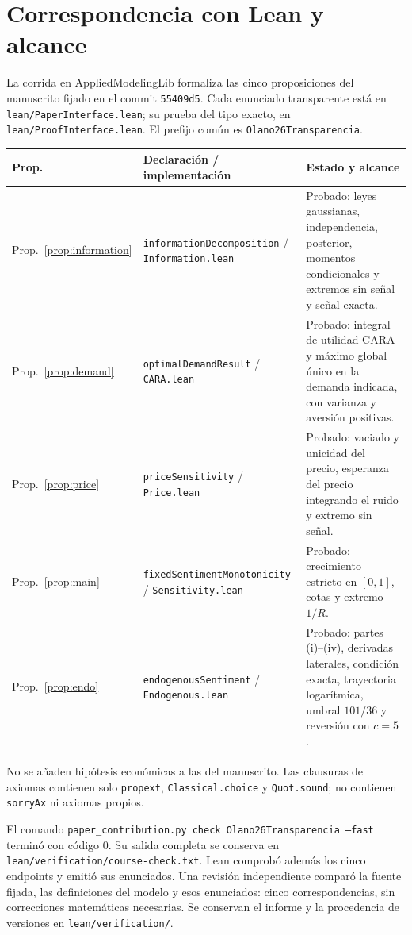 \documentclass[11pt]{article}
\begin{document}
\section{Correspondencia con Lean y alcance}
La corrida en AppliedModelingLib formaliza las cinco proposiciones del
manuscrito fijado en el commit \texttt{55409d5}. Cada enunciado transparente
está en \texttt{lean/PaperInterface.lean}; su prueba del tipo exacto, en
\texttt{lean/ProofInterface.lean}. El prefijo común es
\texttt{Olano26Transparencia}.
\begin{center}\small
\begin{tabular}{>{\raggedright\arraybackslash}p{1.3cm}>{\raggedright\arraybackslash}p{6.0cm}>{\raggedright\arraybackslash}p{5.5cm}}
\toprule
Prop. & Declaración / implementación & Estado y alcance\\
\midrule
Prop.~\ref{prop:information}
& \texttt{informationDecomposition} / \texttt{Information.lean}
& Probado: leyes gaussianas, independencia, posterior, momentos condicionales
y extremos sin señal y señal exacta.\\[0.15cm]
Prop.~\ref{prop:demand}
& \texttt{optimalDemandResult} / \texttt{CARA.lean}
& Probado: integral de utilidad CARA y máximo global único en la demanda
indicada, con varianza y aversión positivas.\\[0.15cm]
Prop.~\ref{prop:price}
& \texttt{priceSensitivity} / \texttt{Price.lean}
& Probado: vaciado y unicidad del precio, esperanza del precio integrando el
ruido y extremo sin señal.\\[0.15cm]
Prop.~\ref{prop:main}
& \texttt{fixedSentimentMonotonicity} / \texttt{Sensitivity.lean}
& Probado: crecimiento estricto en $[0,1]$, cotas y extremo $1/R$.\\[0.15cm]
Prop.~\ref{prop:endo}
& \texttt{endogenousSentiment} / \texttt{Endogenous.lean}
& Probado: partes (i)--(iv), derivadas laterales, condición exacta,
trayectoria logarítmica, umbral $101/36$ y reversión con $c=5$.\\
\bottomrule
\end{tabular}
\end{center}
No se añaden hipótesis económicas a las del manuscrito. Las clausuras de
axiomas contienen solo \texttt{propext}, \texttt{Classical.choice} y
\texttt{Quot.sound}; no contienen \texttt{sorryAx} ni axiomas propios.

El comando \texttt{paper\_contribution.py check Olano26Transparencia --fast}
terminó con código 0. Su salida completa se conserva en
\texttt{lean/verification/course-check.txt}. Lean comprobó además los cinco
endpoints y emitió sus enunciados. Una revisión independiente comparó la
fuente fijada, las definiciones del modelo y esos enunciados: cinco
correspondencias, sin correcciones matemáticas necesarias. Se conservan el
informe y la procedencia de versiones en \texttt{lean/verification/}.
\end{document}
